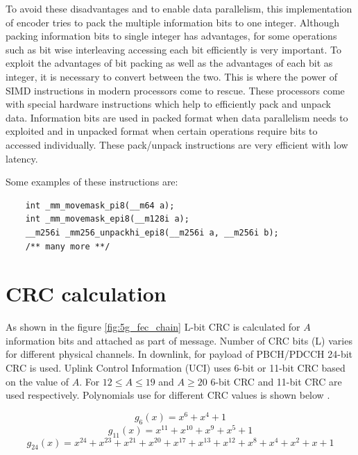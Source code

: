 To avoid these disadvantages and to enable data parallelism, this implementation of encoder tries to pack the multiple information bits to one integer. Although packing information bits to single integer has advantages, for some operations such as bit wise interleaving accessing each bit efficiently is very important. To exploit the advantages of bit packing as well as the advantages of each bit as integer, it is necessary to convert between the two. This is where the power of SIMD instructions in modern processors come to rescue. These processors come with special hardware instructions which help to efficiently pack and unpack data. Information bits are used in packed format when data parallelism needs to exploited and in unpacked format when certain operations require bits to accessed individually. These pack/unpack instructions are very efficient with low latency.

Some examples of these instructions are:
\begin{lstlisting}
	int _mm_movemask_pi8(__m64 a);
	int _mm_movemask_epi8(__m128i a);
	__m256i _mm256_unpackhi_epi8(__m256i a, __m256i b);
	/** many more **/
\end{lstlisting}



\section{CRC calculation}
As shown in the figure \ref{fig:5g_fec_chain} L-bit CRC is calculated for $A$ information bits and attached as part of message. Number of CRC bits (L) varies for different physical channels. In downlink, for payload of PBCH/PDCCH 24-bit CRC is used. Uplink Control Information (UCI) uses 6-bit or 11-bit CRC based on the value of $A$. For $12 \leq A \leq 19$ and $A \geq 20$ 6-bit CRC and 11-bit CRC are used respectively. Polynomials use for different CRC values is shown below \cite{3gpp.38.212}.

\begin{equation} \label{crc_polynomial6}
g_{6}(x) = x^{6} + x^{4} + 1
\end{equation}
\begin{equation} \label{crc_polynomial11}
g_{11}(x) = x^{11} + x^{10} + x^{9} + x^{5} + 1
\end{equation}
\begin{equation} \label{crc_polynomial24}
g_{24}(x) = x^{24} + x^{23} + x^{21} + x^{20} + x^{17} + x^{13} + x^{12} + x^{8} + x^{4} + x^{2} + x + 1
\end{equation}

